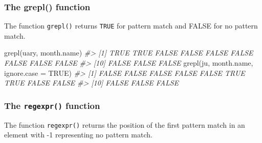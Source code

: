 \documentclass[
]{book}
\newenvironment{Shaded}{\begin{snugshade}}{\end{snugshade}}
\newcommand{\AttributeTok}[1]{\textcolor[rgb]{0.77,0.63,0.00}{#1}}
\newcommand{\CommentTok}[1]{\textcolor[rgb]{0.56,0.35,0.01}{\textit{#1}}}
\newcommand{\ConstantTok}[1]{\textcolor[rgb]{0.00,0.00,0.00}{#1}}
\newcommand{\FunctionTok}[1]{\textcolor[rgb]{0.00,0.00,0.00}{#1}}
\newcommand{\NormalTok}[1]{#1}
\newcommand{\StringTok}[1]{\textcolor[rgb]{0.31,0.60,0.02}{#1}}
\begin{document}
\hypertarget{the-grepl-function}{%
\subsubsection{The grepl() function}\label{the-grepl-function}}

The function \texttt{grepl()} returns \texttt{TRUE} for pattern match and FALSE for no pattern match.

\begin{Shaded}
\begin{Highlighting}[]
\FunctionTok{grepl}\NormalTok{(}\StringTok{\textquotesingle{}uary\textquotesingle{}}\NormalTok{, month.name)}
\CommentTok{\#\textgreater{}  [1]  TRUE  TRUE FALSE FALSE FALSE FALSE FALSE FALSE FALSE}
\CommentTok{\#\textgreater{} [10] FALSE FALSE FALSE}
\FunctionTok{grepl}\NormalTok{(}\StringTok{\textquotesingle{}ju\textquotesingle{}}\NormalTok{, month.name, }\AttributeTok{ignore.case =} \ConstantTok{TRUE}\NormalTok{)}
\CommentTok{\#\textgreater{}  [1] FALSE FALSE FALSE FALSE FALSE  TRUE  TRUE FALSE FALSE}
\CommentTok{\#\textgreater{} [10] FALSE FALSE FALSE}
\end{Highlighting}
\end{Shaded}

\hypertarget{the-regexpr-function}{%
\subsubsection{\texorpdfstring{The \texttt{regexpr()} function}{The regexpr() function}}\label{the-regexpr-function}}

The function \texttt{regexpr()} returns the position of the first pattern match in an element with -1 representing no pattern match.
\end{document}
